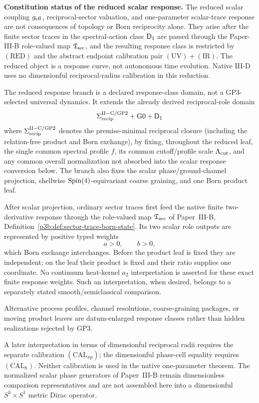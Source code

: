 \documentclass[12pt,a4paper]{article}
\begin{document}
\begin{mdframed}[nobreak=true]
\noindent\textbf{Constitution status of the reduced scalar response.}
The reduced scalar coupling \(g_{\mathrm{eff}}\), reciprocal-sector valuation, and
one-parameter scalar-trace response are not consequences of topology or Born
reciprocity alone.  They arise after the finite sector traces in the
spectral-action class \(\mathsf{D}_1\) are passed through the Paper-III-B role-valued
map \(\mathfrak T_{\rm sec}\), and the resulting response class is restricted
by \((\mathrm{RED})\) and the abstract endpoint
calibration pair \((\mathrm{UV})+(\mathrm{IR})\).  The reduced object is a response curve, not autonomous time evolution.  Native III-D uses no
dimensionful reciprocal-radius calibration in this reduction.
\end{mdframed}

\begin{definition}
\label{p3:def:reduced-response-branch}
The reduced response branch is a declared response-class domain, not a
GP3-selected universal dynamics.  It extends the already derived
reciprocal-role domain
\[
 \Sigma_{\rm recip}^{\rm II-C/GP2}+\mathrm{G0}+\mathsf{D}_1
\]
where \(\Sigma_{\rm recip}^{\rm II-C/GP2}\) denotes the premise-minimal
reciprocal closure (including the relation-free product and Born exchange),
by fixing, throughout the reduced leaf, the single common spectral profile
\(f\), its common cutoff/profile scale \(\Lambda_{\mathrm{cut}}\), and any common overall
normalization not absorbed into the scalar response conversion below.  The
branch also fixes the scalar phase/ground-channel projection, shellwise
\(\mathrm{Spin}(4)\)-equivariant coarse graining, and one Born product leaf.

After scalar projection, ordinary sector traces first feed the native finite
two-derivative response through the role-valued map
\(\mathfrak T_{\rm sec}\) of
Paper~III-B, Definition~\ref{p3b:def:sector-trace-born-state}.  Its two
scalar role outputs are
represented by positive typed weights
\[
 a>0,\qquad b>0,
\]
which Born exchange interchanges.  Before the product leaf is fixed they are
independent; on the leaf their product is fixed and their ratio supplies one
coordinate.  No continuum heat-kernel \(a_2\) interpretation is asserted for
these exact finite response weights.  Such an interpretation, when desired,
belongs to a separately stated smooth/semiclassical comparison.

Alternative process profiles, channel resolutions, coarse-graining packages,
or moving product leaves are datum-enlarged response classes rather than
hidden realizations rejected by GP3.

A later interpretation in terms of dimensionful reciprocal radii requires the
separate calibration \((\mathrm{CAL}_{xp})\); the dimensionful phase-cell
equality requires \((\mathrm{CAL}_{\hbar})\).  Neither calibration is used in
the native one-parameter theorem.  The normalized scalar phase generators of
Paper~III-B remain dimensionless comparison representatives and are not
assembled here into a dimensionful \(S^3\times S^1\) metric Dirac operator.
\end{definition}
\end{document}

